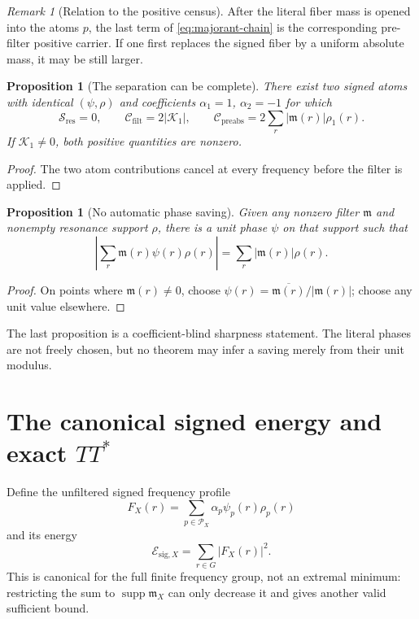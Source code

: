 \documentclass[11pt]{article}
\newtheorem{proposition}[theorem]{Proposition}
\theoremstyle{remark}
\newtheorem{remark}[theorem]{Remark}
\begin{document}
\begin{remark}[Relation to the positive census]
After the literal fiber mass is opened into the atoms \(p\), the
last term of \eqref{eq:majorant-chain} is the corresponding
pre-filter positive carrier.  If one first replaces the signed
fiber by a uniform absolute mass, it may be still larger.
\end{remark}

\begin{proposition}[The separation can be complete]
\label{prop:complete-separation}
There exist two signed atoms with identical
\((\psi,\rho)\) and coefficients \(\alpha_1=1\),
\(\alpha_2=-1\) for which
\[
 \mathcal S_{\mathrm{res}}=0,\qquad
 \mathcal C_{\mathrm{filt}}=2|\mathcal K_1|,
\qquad
 \mathcal C_{\mathrm{preabs}}
 =2\sum_r|\mathfrak m(r)|\rho_1(r).
\]
If \(\mathcal K_1\ne0\), both positive quantities are nonzero.
\end{proposition}

\begin{proof}
The two atom contributions cancel at every frequency before the
filter is applied.
\end{proof}

\begin{proposition}[No automatic phase saving]
\label{prop:gauge-saturation}
Given any nonzero filter \(\mathfrak m\) and nonempty resonance
support \(\rho\), there is a unit phase \(\psi\) on that support such
that
\[
 \left|
 \sum_r\mathfrak m(r)\psi(r)\rho(r)
 \right|
 =
 \sum_r|\mathfrak m(r)|\rho(r).
\]
\end{proposition}

\begin{proof}
On points where \(\mathfrak m(r)\ne0\), choose
\(\psi(r)=\overline{\mathfrak m(r)}/|\mathfrak m(r)|\); choose any
unit value elsewhere.
\end{proof}

The last proposition is a coefficient-blind sharpness statement.
The literal phases are not freely chosen, but no theorem may infer a
saving merely from their unit modulus.

\section{\texorpdfstring{\hspace{0.35em}}{}The canonical signed energy and exact
\texorpdfstring{\(TT^*\)}{TT-star}}

Define the unfiltered signed frequency profile
\begin{equation}
 F_X(r)
 =
 \sum_{p\in\mathcal P_X}
 \alpha_p\psi_p(r)\rho_p(r)
\label{eq:signed-profile}
\end{equation}
and its energy
\begin{equation}
\mathcal E_{\mathrm{sig},X}
=
\sum_{r\in G}|F_X(r)|^2.
\label{eq:signed-energy}
\end{equation}
This is canonical for the full finite frequency group, not an
extremal minimum: restricting the sum to
\(\operatorname{supp}\mathfrak m_X\) can only decrease it and gives
another valid sufficient bound.
\end{document}
